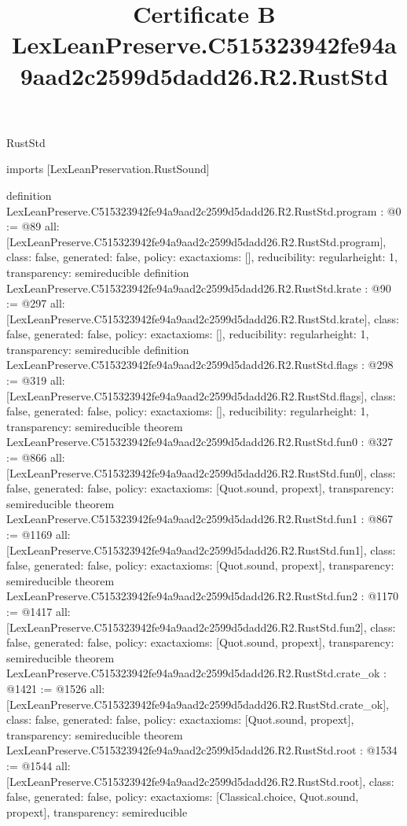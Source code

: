 \begin{lexlean}{RustStd}
\title{Certificate B LexLeanPreserve.C515323942fe94a9aad2c2599d5dadd26.R2.RustStd}
\begin{coremodule}
imports [LexLeanPreservation.RustSound]

definition LexLeanPreserve.C515323942fe94a9aad2c2599d5dadd26.R2.RustStd.program : @0 := @89 {
  all: [LexLeanPreserve.C515323942fe94a9aad2c2599d5dadd26.R2.RustStd.program],
  class: false,
  generated: false,
  policy: exact{axioms: []},
  reducibility: regular{height: 1},
  transparency: semireducible
}
definition LexLeanPreserve.C515323942fe94a9aad2c2599d5dadd26.R2.RustStd.krate : @90 := @297 {
  all: [LexLeanPreserve.C515323942fe94a9aad2c2599d5dadd26.R2.RustStd.krate],
  class: false,
  generated: false,
  policy: exact{axioms: []},
  reducibility: regular{height: 1},
  transparency: semireducible
}
definition LexLeanPreserve.C515323942fe94a9aad2c2599d5dadd26.R2.RustStd.flags : @298 := @319 {
  all: [LexLeanPreserve.C515323942fe94a9aad2c2599d5dadd26.R2.RustStd.flags],
  class: false,
  generated: false,
  policy: exact{axioms: []},
  reducibility: regular{height: 1},
  transparency: semireducible
}
theorem LexLeanPreserve.C515323942fe94a9aad2c2599d5dadd26.R2.RustStd.fun0 : @327 := @866 {
  all: [LexLeanPreserve.C515323942fe94a9aad2c2599d5dadd26.R2.RustStd.fun0],
  class: false,
  generated: false,
  policy: exact{axioms: [Quot.sound, propext]},
  transparency: semireducible
}
theorem LexLeanPreserve.C515323942fe94a9aad2c2599d5dadd26.R2.RustStd.fun1 : @867 := @1169 {
  all: [LexLeanPreserve.C515323942fe94a9aad2c2599d5dadd26.R2.RustStd.fun1],
  class: false,
  generated: false,
  policy: exact{axioms: [Quot.sound, propext]},
  transparency: semireducible
}
theorem LexLeanPreserve.C515323942fe94a9aad2c2599d5dadd26.R2.RustStd.fun2 : @1170 := @1417 {
  all: [LexLeanPreserve.C515323942fe94a9aad2c2599d5dadd26.R2.RustStd.fun2],
  class: false,
  generated: false,
  policy: exact{axioms: [Quot.sound, propext]},
  transparency: semireducible
}
theorem LexLeanPreserve.C515323942fe94a9aad2c2599d5dadd26.R2.RustStd.crate_ok : @1421 := @1526 {
  all: [LexLeanPreserve.C515323942fe94a9aad2c2599d5dadd26.R2.RustStd.crate_ok],
  class: false,
  generated: false,
  policy: exact{axioms: [Quot.sound, propext]},
  transparency: semireducible
}
theorem LexLeanPreserve.C515323942fe94a9aad2c2599d5dadd26.R2.RustStd.root : @1534 := @1544 {
  all: [LexLeanPreserve.C515323942fe94a9aad2c2599d5dadd26.R2.RustStd.root],
  class: false,
  generated: false,
  policy: exact{axioms: [Classical.choice, Quot.sound, propext]},
  transparency: semireducible
}


\end{coremodule}
\end{lexlean}
